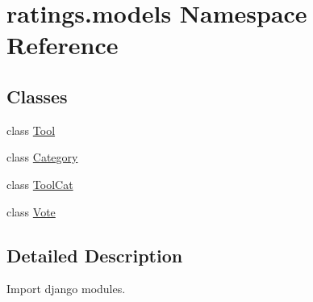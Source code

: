 \hypertarget{namespaceratings_1_1models}{\section{ratings.\-models Namespace Reference}
\label{namespaceratings_1_1models}
}
\subsection*{Classes}
\begin{DoxyCompactItemize}
\item 
class \hyperlink{classratings_1_1models_1_1Tool}{Tool}
\item 
class \hyperlink{classratings_1_1models_1_1Category}{Category}
\item 
class \hyperlink{classratings_1_1models_1_1ToolCat}{Tool\-Cat}
\item 
class \hyperlink{classratings_1_1models_1_1Vote}{Vote}
\end{DoxyCompactItemize}


\subsection{Detailed Description}
\begin{DoxyVerb}Import django modules.
\end{DoxyVerb}
 